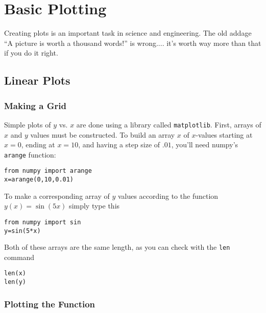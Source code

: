 \chapter{Basic Plotting}
\label{chap:1DPlots}

Creating plots is an important task in science and engineering.  The
old addage ``A picture is worth a thousand words!'' is wrong.... it's
worth way more than that if you do it right.
\medskip

\section{Linear Plots}

\subsection*{Making a Grid}
 Simple plots of $y$ vs. $x$ are done using a
library called \texttt{matplotlib}.  First, arrays of $x$ and $y$
values must be constructed.  To build an array $x$ of $x$-values
starting at $x=0$, ending at $x=10$, and having a step size of
$.01$, you'll need numpy's \texttt{arange} function:
\begin{Verbatim}
from numpy import arange
x=arange(0,10,0.01)
\end{Verbatim}
To make a corresponding array of $y$ values according to the
function $y(x)=\sin(5x)$ simply type this
\begin{Verbatim}
from numpy import sin
y=sin(5*x)
\end{Verbatim}
Both of these arrays are the same length, as you can check with the
{\tt len} command
\begin{Verbatim}
len(x)
len(y)
\end{Verbatim}

\subsection*{Plotting the Function}

